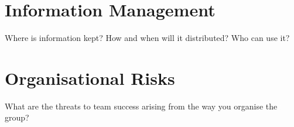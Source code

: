 \documentclass{article}
\begin{document}
\section{Information Management}

Where is information kept?  How and when will it distributed?  Who can
use it?


\section{Organisational Risks}

What are the threats to team success arising from the way you organise
the group?




\end{document}
